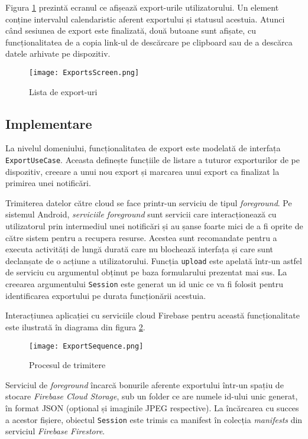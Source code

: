 Figura \ref{exportsScreen} prezintă ecranul ce afișează export-urile utilizatorului. Un element conține intervalul calendaristic aferent exportului și statusul acestuia. Atunci când sesiunea de export este finalizată, două butoane sunt afișate, cu funcționalitatea de a copia link-ul de descărcare pe clipboard sau de a descărca datele arhivate pe dispozitiv.

\begin{figure}[ht]
  \centering
  \texttt{[image: ExportsScreen.png]}
  \caption{Lista de export-uri}
  \label{exportsScreen}
\end{figure}

\subsection{Implementare}

La nivelul domeniului, funcționalitatea de export este modelată de interfața \texttt{ExportUseCase}. Aceasta definește funcțiile de listare a tuturor exporturilor de pe dispozitiv, creeare a unui nou export și marcarea unui export ca finalizat la primirea unei notificări.



Trimiterea datelor către cloud se face printr-un serviciu de tipul \emph{foreground}. Pe sistemul Android, \emph{serviciile foreground} sunt servicii care interacționează cu utilizatorul prin intermediul unei notificări și au șanse foarte mici de a fi oprite de către sistem pentru a recupera resurse. Acestea sunt recomandate pentru a executa activități de lungă durată care nu blochează interfața și care sunt declanșate de o acțiune a utilizatorului. Funcția \texttt{upload} este apelată într-un astfel de serviciu cu argumentul obținut pe baza formularului prezentat mai sus. La creearea argumentului \texttt{Session} este generat un id unic ce va fi folosit pentru identificarea exportului pe durata funcționării acestuia.

Interacțiunea aplicației cu serviciile cloud Firebase pentru această funcționalitate este ilustrată în diagrama din figura \ref{exportProcess}.

\begin{figure}[ht]
  \centering
  \texttt{[image: ExportSequence.png]}
  \caption{Procesul de trimitere}
  \label{exportProcess}
\end{figure}

Serviciul de \emph{foreground} încarcă bonurile aferente exportului într-un spațiu de stocare \emph{Firebase Cloud Storage}, sub un folder ce are numele id-ului unic generat, în format JSON (opțional și imaginile JPEG respective). La încărcarea cu succes a acestor fișiere, obiectul \texttt{Session} este trimis ca manifest în colecția \emph{manifests} din serviciul \emph{Firebase Firestore}.

